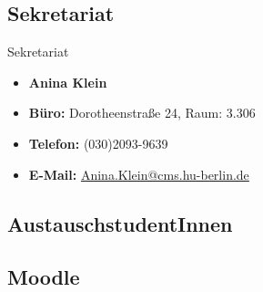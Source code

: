 %
\subsection{Sekretariat}

\begin{frame}{Sekretariat}
	
\begin{itemize}
	\item[] \textbf{Anina Klein}	
	\item \textbf{Büro:} Dorotheenstraße 24, Raum: 3.306
	\item \textbf{Telefon:} (030)2093-9639
	\item \textbf{E-Mail:} \href{mailto:Anina.Klein@cms.hu-berlin.de}{Anina.Klein@cms.hu-berlin.de}
\end{itemize}	

\end{frame}


\subsection{AustauschstudentInnen}


%
\subsection{Moodle}	

